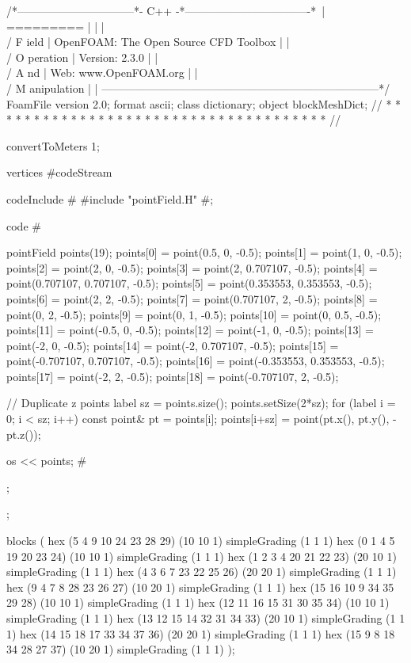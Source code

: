 \begin{OFverbatim}
/*--------------------------------*- C++ -*----------------------------------*\
| =========                 |                                                 |
| \\      /  F ield         | OpenFOAM: The Open Source CFD Toolbox           |
|  \\    /   O peration     | Version:  2.3.0                                 |
|   \\  /    A nd           | Web:      www.OpenFOAM.org                      |
|    \\/     M anipulation  |                                                 |
\*---------------------------------------------------------------------------*/
FoamFile
{
    version     2.0;
    format      ascii;
    class       dictionary;
    object      blockMeshDict;
}
// * * * * * * * * * * * * * * * * * * * * * * * * * * * * * * * * * * * * * //

convertToMeters 1;

vertices #codeStream
{
    codeInclude
    #{
        #include "pointField.H"
    #};

    code
    #{
        pointField points(19);
        points[0]  = point(0.5, 0, -0.5);
        points[1]  = point(1, 0, -0.5);
        points[2]  = point(2, 0, -0.5);
        points[3]  = point(2, 0.707107, -0.5);
        points[4]  = point(0.707107, 0.707107, -0.5);
        points[5]  = point(0.353553, 0.353553, -0.5);
        points[6]  = point(2, 2, -0.5);
        points[7]  = point(0.707107, 2, -0.5);
        points[8]  = point(0, 2, -0.5);
        points[9]  = point(0, 1, -0.5);
        points[10] = point(0, 0.5, -0.5);
        points[11] = point(-0.5, 0, -0.5);
        points[12] = point(-1, 0, -0.5);
        points[13] = point(-2, 0, -0.5);
        points[14] = point(-2, 0.707107, -0.5);
        points[15] = point(-0.707107, 0.707107, -0.5);
        points[16] = point(-0.353553, 0.353553, -0.5);
        points[17] = point(-2, 2, -0.5);
        points[18] = point(-0.707107, 2, -0.5);

        // Duplicate z points
        label sz = points.size();
        points.setSize(2*sz);
        for (label i = 0; i < sz; i++)
        {
            const point& pt = points[i];
            points[i+sz] = point(pt.x(), pt.y(), -pt.z());
        }

        os  << points;
    #};
};


blocks          
(
    hex (5 4 9 10 24 23 28 29) (10 10 1) simpleGrading (1 1 1)
    hex (0 1 4 5 19 20 23 24) (10 10 1) simpleGrading (1 1 1)
    hex (1 2 3 4 20 21 22 23) (20 10 1) simpleGrading (1 1 1)
    hex (4 3 6 7 23 22 25 26) (20 20 1) simpleGrading (1 1 1)
    hex (9 4 7 8 28 23 26 27) (10 20 1) simpleGrading (1 1 1)
    hex (15 16 10 9 34 35 29 28) (10 10 1) simpleGrading (1 1 1)
    hex (12 11 16 15 31 30 35 34) (10 10 1) simpleGrading (1 1 1)
    hex (13 12 15 14 32 31 34 33) (20 10 1) simpleGrading (1 1 1)
    hex (14 15 18 17 33 34 37 36) (20 20 1) simpleGrading (1 1 1)
    hex (15 9 8 18 34 28 27 37) (10 20 1) simpleGrading (1 1 1)
);


\end{OFverbatim}
